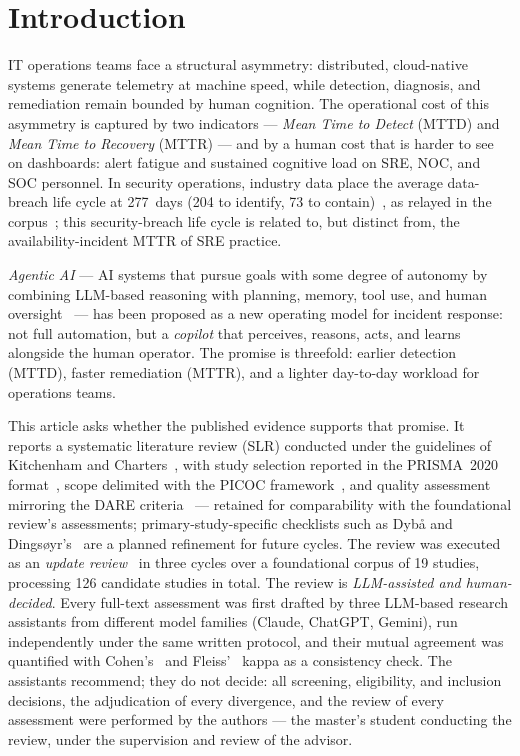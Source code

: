 \documentclass{ieeeaccess}
\begin{document}
\section{Introduction}
\label{sec:intro}

 IT operations teams face a structural asymmetry:
distributed, cloud-native systems generate telemetry at machine speed,
while detection, diagnosis, and remediation remain bounded by human
cognition. The operational cost of this asymmetry is captured by two
indicators --- \emph{Mean Time to Detect} (MTTD) and \emph{Mean Time to
Recovery} (MTTR) --- and by a human cost that is harder to see on
dashboards: alert fatigue and sustained cognitive load on SRE, NOC, and
SOC personnel. In security operations, industry data place the average
data-breach life cycle at 277~days (204 to identify, 73 to
contain)~\cite{ibm2023breach}, as relayed in the corpus~\cite{P79}; this
security-breach life cycle is related to, but distinct from, the
availability-incident MTTR of SRE practice.

\emph{Agentic AI} --- AI systems that pursue goals with some degree of
autonomy by combining LLM-based reasoning with planning, memory, tool
use, and human oversight~\cite{P09,P10} --- has been proposed as a new
operating model for incident response: not full automation, but a
\emph{copilot} that perceives, reasons, acts, and learns alongside the
human operator. The promise is threefold: earlier detection (MTTD),
faster remediation (MTTR), and a lighter day-to-day workload for
operations teams.

This article asks whether the published evidence supports that promise.
It reports a systematic literature review (SLR) conducted under the
guidelines of Kitchenham and Charters~\cite{kitchenham2007}, with study
selection reported in the PRISMA~2020 format~\cite{page2021prisma}, scope
delimited with the PICOC framework~\cite{petticrew2006}, and quality
assessment mirroring the DARE criteria~\cite{dare} --- retained for
comparability with the foundational review's assessments;
primary-study-specific checklists such as Dyb{\aa} and
Dings{\o}yr's~\cite{dyba2008} are a planned refinement for future
cycles. The review was
executed as an \emph{update review}~\cite{mendes2020update} in three
cycles over a foundational
corpus of 19 studies, processing 126 candidate studies in total. The
review is \emph{LLM-assisted and human-decided}. Every full-text
assessment was first drafted by three LLM-based research assistants
from different model families (Claude, ChatGPT, Gemini), run
independently under the same written protocol, and their mutual
agreement was quantified with Cohen's~\cite{cohen1960} and
Fleiss'~\cite{fleiss1971} kappa as a consistency check. The assistants
recommend; they do not decide: all screening, eligibility, and
inclusion decisions, the adjudication of every divergence, and the
review of every assessment were performed by the authors --- the
master's student conducting the review, under the supervision and
review of the advisor.
\end{document}
